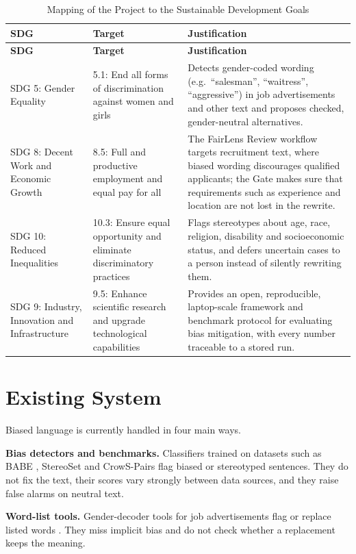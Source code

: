 \documentclass[12pt,a4paper,oneside]{report}
\begin{document}
\begin{longtable}{|L{2.8cm}|L{3.6cm}|L{7.4cm}|}
\caption{Mapping of the Project to the Sustainable Development Goals}\label{tab:sdg}\\
\hline
\textbf{SDG} & \textbf{Target} & \textbf{Justification}\\ \hline\endfirsthead
\hline \textbf{SDG} & \textbf{Target} & \textbf{Justification}\\ \hline\endhead
SDG 5: Gender Equality & 5.1: End all forms of discrimination against women and girls & Detects gender-coded wording
(e.g.\ ``salesman'', ``waitress'', ``aggressive'') in job advertisements and other text and proposes checked,
gender-neutral alternatives.\\ \hline
SDG 8: Decent Work and Economic Growth & 8.5: Full and productive employment and equal pay for all & The FairLens
Review workflow targets recruitment text, where biased wording discourages qualified applicants; the Gate makes sure
that requirements such as experience and location are not lost in the rewrite.\\ \hline
SDG 10: Reduced Inequalities & 10.3: Ensure equal opportunity and eliminate discriminatory practices & Flags
stereotypes about age, race, religion, disability and socioeconomic status, and defers uncertain cases to a person
instead of silently rewriting them.\\ \hline
SDG 9: Industry, Innovation and Infrastructure & 9.5: Enhance scientific research and upgrade technological
capabilities & Provides an open, reproducible, laptop-scale framework and benchmark protocol for evaluating bias
mitigation, with every number traceable to a stored run.\\ \hline
\end{longtable}

\section{Existing System}
Biased language is currently handled in four main ways.

\textbf{Bias detectors and benchmarks.} Classifiers trained on datasets such as BABE \cite{babe}, StereoSet
\cite{stereoset} and CrowS-Pairs \cite{crows} flag biased or stereotyped sentences. They do not fix the text, their
scores vary strongly between data sources, and they raise false alarms on neutral text.

\textbf{Word-list tools.} Gender-decoder tools for job advertisements flag or replace listed words \cite{gaucher}.
They miss implicit bias and do not check whether a replacement keeps the meaning.
\end{document}
